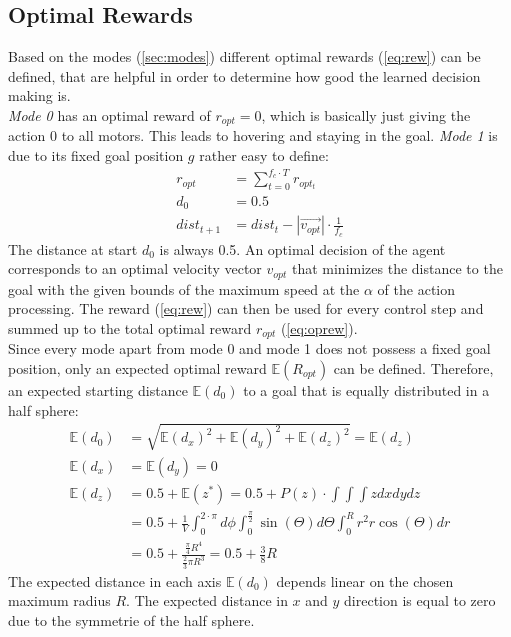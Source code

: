 \subsection{Optimal Rewards}
Based on the modes (\cref{sec:modes}) different optimal rewards (\cref{eq:rew}) can be defined, that are helpful in order to determine how good the learned decision making is.\\
\emph{Mode 0} has an optimal reward of $r_{opt} = 0$, which is basically just giving the action $0$ to all motors. This leads to hovering and staying in the goal.
\emph{Mode 1} is due to its fixed goal position $g$ rather easy to define:
\begin{align}
r_{opt} &= \sum_{t=0}^{f_c \cdot T}  r_{opt_t} \label{eq:oprew}\\
d_0 &= 0.5\\
dist_{t+1} &= dist_t - |\overrightarrow{v_{opt}}| \cdot \frac{1}{f_c} \label{eq:dt1}%
\end{align}
The distance at start $d_0$ is always 0.5. An optimal decision of the agent corresponds to an optimal velocity vector $v_{opt}$ that minimizes the distance to the goal with the given bounds of the maximum speed at the $\alpha$ of the action processing. The reward (\cref{eq:rew}) can then be used for every control step and summed up to the total optimal reward $r_{opt}$ (\cref{eq:oprew}).\\
Since every mode apart from mode 0 and mode 1 does not possess a fixed goal position, only an expected optimal reward $\mathbb{E}(R_{opt})$ can be defined. Therefore, an expected starting distance $\mathbb{E}(d_0)$ to a goal that is equally distributed in a half sphere:
\begin{align}
	\mathbb{E}(d_0) &= \sqrt{\mathbb{E}(d_x)^2 + \mathbb{E}(d_y)^2 + \mathbb{E}(d_z)^2}  = \mathbb{E}(d_z) \\
	\mathbb{E}(d_x) &= \mathbb{E}(d_y) = 0\\
	\mathbb{E}(d_z) &= 0.5 + \mathbb{E}(z^*) = 0.5 + P(z) \cdot \int \int \int  z dx dy dz \nonumber \\
	&= 0.5 + \frac{1}{V} \int_{0}^{2 \cdot \pi} d \phi \int_{0}^{\frac{\pi}{2}} \sin(\Theta) d\Theta \int_{0}^{R} r^2 r \cos(\Theta)  dr  \nonumber \\
	&= 0.5 + \frac{\frac{\pi}{4} R^4}{\frac{2}{3} \pi R^3} = 0.5 + \frac{3}{8} R
\end{align}
The expected distance in each axis $\mathbb{E}(d_0)$ depends linear on the chosen maximum radius $R$. The expected distance in $x$ and $y$ direction is equal to zero due to the symmetrie of the half sphere.\\
